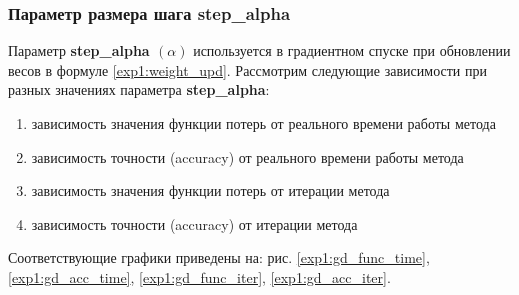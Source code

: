 \documentclass[a4paper, 11pt]{article}
\begin{document}
            \subsubsection{Параметр размера шага \textbf{step\_alpha}}
                Параметр \textbf{step\_alpha $(\alpha)$} используется в градиентном спуске при обновлении весов в формуле \ref{exp1:weight_upd}.
                Рассмотрим следующие зависимости при разных значениях параметра \textbf{step\_alpha}:
                    \begin{enumerate}\label{exp:dependencies}
                        \item зависимость значения функции потерь от реального времени работы метода
                        \item зависимость точности (accuracy) от реального времени работы метода
                        \item зависимость значения функции потерь от итерации метода
                        \item зависимость точности (accuracy) от итерации метода
                     \end{enumerate}
                 Соответствующие графики приведены на: рис. \ref{exp1:gd_func_time}, \ref{exp1:gd_acc_time}, \ref{exp1:gd_func_iter}, \ref{exp1:gd_acc_iter}.
   
\end{document}
